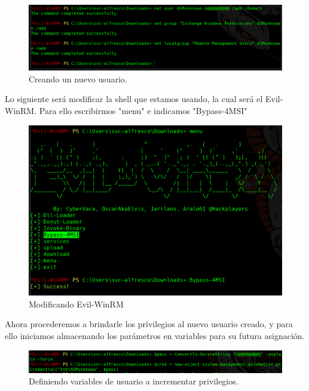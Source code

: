 \documentclass{article}
\begin{document}
\begin{figure}[H]
	\center
	\includegraphics[width=\textwidth]{images/forest/creando-usuario-nuevo-chetao.png}
	\caption{Creando un nuevo usuario.}
\end{figure}

Lo siguiente será modificar la shell que estamos usando, la cual será el Evil-WinRM. Para ello escribirmos "menu" e indicamos "Bypass-4MSI"

\begin{figure}[H]
	\center
	\includegraphics[width=\textwidth]{images/forest/modificnadoWinRM-Bypoass.png}
	\caption{Modificando Evil-WinRM}
\end{figure}

Ahora procederemos a brindarle los privilegios al nuevo usuario creado, y para ello iniciamos almacenando los parámetros en variables para su futura asignación.

\begin{figure}[H]
	\center
	\includegraphics[width=\textwidth]{images/forest/definiendo_variables_para_permisosusuarionuevo.png}
	\caption{Definiendo variables de usuario a incrementar privilegios.}
\end{figure}
\end{document}
